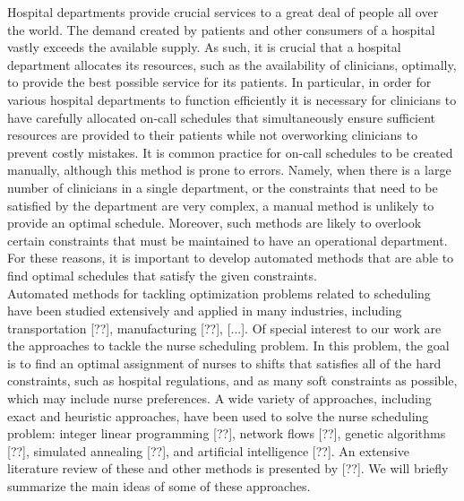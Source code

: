 Hospital departments provide crucial services to a great deal of people all over the world. The demand created by patients and other consumers of a hospital vastly exceeds the available supply. As such, it is crucial that a hospital department allocates its resources, such as the availability of clinicians, optimally, to provide the best possible service for its patients. In particular, in order for various hospital departments to function efficiently it is necessary for clinicians to have carefully allocated on-call schedules that simultaneously ensure sufficient resources are provided to their patients while not overworking clinicians to prevent costly mistakes. It is common practice for on-call schedules to be created manually, although this method is prone to errors. Namely, when there is a large number of clinicians in a single department, or the constraints that need to be satisfied by the department are very complex, a manual method is unlikely to provide an optimal schedule. Moreover, such methods are likely to overlook certain constraints that must be maintained to have an operational department. For these reasons, it is important to develop automated methods that are able to find optimal schedules that satisfy the given constraints. \\


Automated methods for tackling optimization problems related to scheduling have been studied extensively and applied in many industries, including transportation [??], manufacturing [??], [...]. Of special interest to our work are the approaches to tackle the nurse scheduling problem. In this problem, the goal is to find an optimal assignment of nurses to shifts that satisfies all of the hard constraints, such as hospital regulations, and as many soft constraints as possible, which may include nurse preferences. A wide variety of approaches, including exact and heuristic approaches, have been used to solve the nurse scheduling problem: integer linear programming [??], network flows [??], genetic algorithms [??], simulated annealing [??], and artificial intelligence [??]. An extensive literature review of these and other methods is presented by [??]. We will briefly summarize the main ideas of some of these approaches. \\

